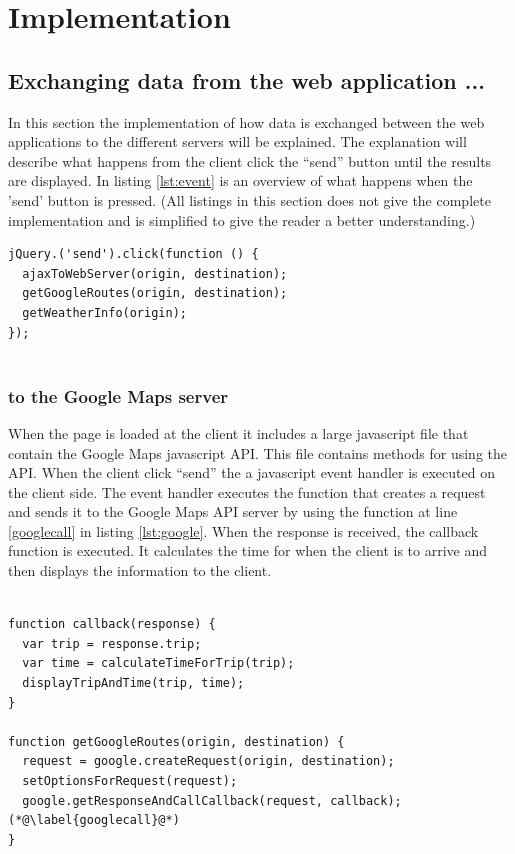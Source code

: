 \documentclass[10pt,a4paper]{article}
\begin{document}
\section{Implementation}

\subsection{Exchanging data from the web application ...}
\label{sec:sending-data-from}
In this section the implementation of how data is exchanged between the web applications to the different servers will be explained. The explanation will describe what happens from the client click the ``send'' button until the results are displayed. In listing \ref{lst:event} is an overview of what happens when the 'send' button is pressed. (All listings in this section does not give the complete implementation and is simplified to give the reader a better understanding.)

\begin{lstlisting}[caption=Event handler, label=lst:event]
jQuery.('send').click(function () {
  ajaxToWebServer(origin, destination);
  getGoogleRoutes(origin, destination);
  getWeatherInfo(origin);
});
  
\end{lstlisting}
\subsubsection{to the Google Maps server}
\label{sec:google-maps-javascr}
When the page is loaded at the client it includes a large javascript file that contain the Google Maps javascript API. This file contains methods for using the API.
When the client click ``send'' the a javascript event handler is executed on the client side. The event handler executes the function that creates a request and sends it to the Google Maps API server by using the function at line \ref{googlecall} in listing \ref{lst:google}. When the response is received, the callback function is  executed. It calculates the time for when the client is to arrive and then displays the information to the client.

\begin{lstlisting}[caption=Using the Google Maps javascript API, label=lst:google]

function callback(response) {
  var trip = response.trip;
  var time = calculateTimeForTrip(trip);
  displayTripAndTime(trip, time);
}

function getGoogleRoutes(origin, destination) {
  request = google.createRequest(origin, destination);
  setOptionsForRequest(request);
  google.getResponseAndCallCallback(request, callback); (*@\label{googlecall}@*)
}
  
\end{lstlisting}
\end{document}
